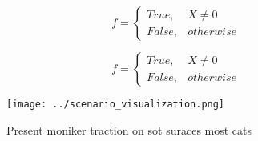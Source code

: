 \documentclass[a4paper]{article}
\begin{document}
\begin{equation}   f =
\begin{cases} True, & X \neq 0\\
False, & otherwise
\end{cases}
\end{equation}

\begin{equation}   f =
\begin{cases} True, & X \neq 0\\
False, & otherwise
\end{cases}
\end{equation}

\begin{figure}
\centering
\texttt{[image: ../scenario\_visualization.png]}
\caption{Present moniker traction on sot suraces most cats
}
\end{figure}
 
\end{document}
